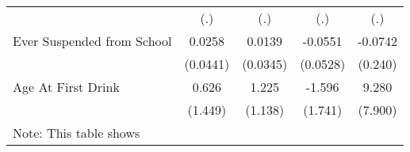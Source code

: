 {\begin{tabular}{l*{4}{c}}
            &         (.)         &         (.)         &         (.)         &         (.)         \\
[1em]
Ever Suspended from School&      0.0258         &      0.0139         &     -0.0551         &     -0.0742         \\
            &    (0.0441)         &    (0.0345)         &    (0.0528)         &     (0.240)         \\
[1em]
Age At First Drink&       0.626         &       1.225         &      -1.596         &       9.280         \\
            &     (1.449)         &     (1.138)         &     (1.741)         &     (7.900)         \\
\hline\hline
\multicolumn{5}{l}{\footnotesize Note: This table shows}\\
\end{tabular}
}
